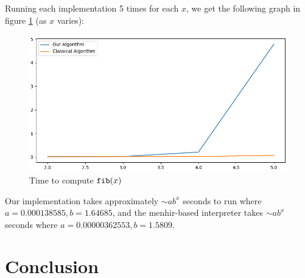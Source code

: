 \documentclass{llncs}
\begin{document}
\noindent Running each implementation 5 times for each $x$, we get the following graph in figure \ref{fig:fib} (as $x$ varies):

\begin{figure}

    \centerline{\includegraphics[width=\hsize]{../Docs/Images/expr.png}}
    \caption{Time to compute $\hbox{\tt fib}(x)$}
    \label{fig:fib}

\end{figure}

Our implementation takes approximately $\sim ab^x$ seconds to run where $a=0.000138585, b=1.64685$, and the menhir-based interpreter takes $\sim ab^x$ seconds where $a=0.00000362553, b=1.5809$.

\section{Conclusion}
\end{document}
